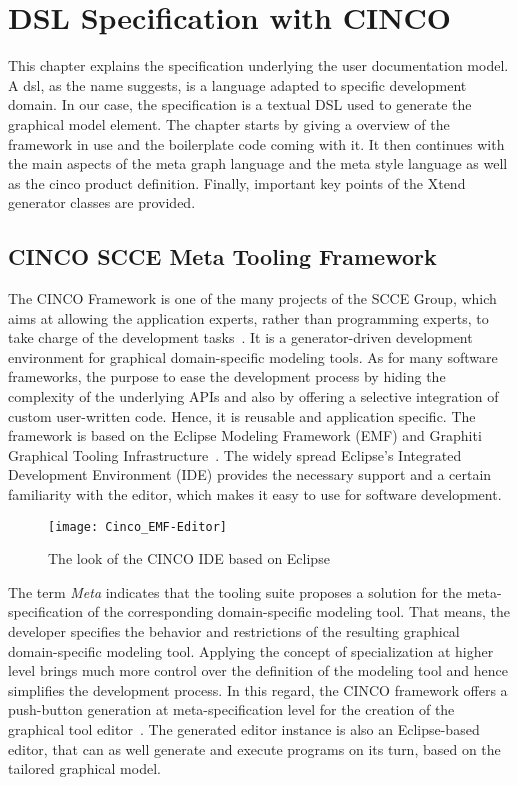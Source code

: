 
\chapter{DSL Specification with CINCO}\label{ch:DSL}
This chapter explains the specification underlying the user documentation model. A \acrshort{dsl}, as the name suggests, is a language adapted to specific development domain. In our case, the specification is a textual DSL used to generate the graphical model element. The chapter starts by giving a overview of the framework in use and the boilerplate code coming with it. It then continues with the main aspects of the meta graph language and the meta style language as well as the cinco product definition. Finally, important key points of the Xtend generator classes are provided.
\section{CINCO SCCE Meta Tooling Framework}\label{sec:CTF}
The CINCO Framework is one of the many projects of the SCCE Group, which aims at allowing the application experts, rather than programming experts, to take charge of the development tasks~\cite{scce}. It is a generator-driven development environment for graphical domain-specific modeling tools. As for many software frameworks, the purpose to ease the development process by hiding the complexity of the underlying APIs and also by offering a selective integration of custom user-written code. Hence, it is reusable and application specific. The framework is based on the Eclipse Modeling Framework (EMF) and Graphiti Graphical Tooling Infrastructure~\cite{Cinco}. The widely spread Eclipse's Integrated Development Environment (IDE) provides the necessary support and a certain familiarity with the editor, which makes it easy to use for software development.
\begin{figure}[h]
    \texttt{[image: Cinco\_EMF-Editor]}
    \caption{The look of the CINCO IDE based on Eclipse}
\end{figure}

The term \textit{Meta} indicates that the tooling suite proposes a solution for the meta-specification of the corresponding domain-specific modeling tool. That means, the developer specifies the behavior and restrictions of the resulting graphical domain-specific modeling tool. Applying the concept of specialization at higher level brings much more control over the definition of the modeling tool and hence simplifies the development process. In this regard, the CINCO framework offers a push-button generation at meta-specification level for the creation of the graphical tool editor~\cite{scce}. The generated editor instance is also an Eclipse-based editor, that can as well generate and execute programs on its turn, based on the tailored graphical model.

